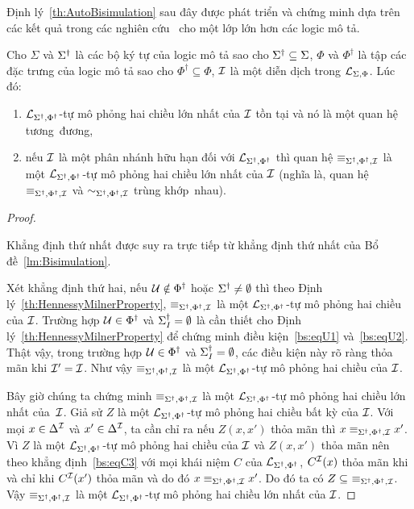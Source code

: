 Định lý~\ref{th:AutoBisimulation} sau đây được phát triển và chứng minh dựa trên các kết quả trong các nghiên cứu~\cite{Divroodi2011B,Nguyen2013} cho một lớp lớn hơn các logic mô tả.

\begin{Theorem} 
\label{th:AutoBisimulation}
	Cho $\Sigma$ và $\Sigma^\dag$ là các bộ ký tự của logic mô tả sao cho $\Sigma^\dag \subseteq \Sigma$, $\Phi$ và $\Phi^\dag$ là tập các đặc trưng của logic mô tả sao cho $\Phi^\dag \subseteq \Phi$, $\mathcal{I}$ là một diễn dịch trong $\mathcal{L}_{\Sigma,\Phi}$. Lúc đó:
	\begin{enumerate}
		\item $\mathcal{L}_{\Sigma^\dag,\Phi^\dag}$-tự mô phỏng hai chiều lớn nhất của $\mathcal{I}$ tồn tại và nó là một quan hệ tương~đương,\label{th:AutoBisimulation-item1}  
		\item nếu $\mathcal{I}$ là một phân nhánh hữu hạn đối với $\mathcal{L}_{\Sigma^\dag,\Phi^\dag}$ thì quan hệ $\equiv_{\Sigma^\dag,\Phi^\dag,\mathcal{I}}$ là một $\mathcal{L}_{\Sigma^\dag,\Phi^\dag}$-tự mô phỏng hai chiều lớn nhất của $\mathcal{I}$ (nghĩa là, quan hệ $\equiv_{\Sigma^\dag,\Phi^\dag,\mathcal{I}}$ và $\sim_{\Sigma^\dag,\Phi^\dag,\mathcal{I}}$ trùng khớp~nhau).\label{th:AutoBisimulation-item2}\myend
	\end{enumerate}
\end{Theorem}

\begin{proof}~

\semiItem Khẳng định thứ nhất được suy ra trực tiếp từ khẳng định thứ nhất của Bổ đề~\ref{lm:Bisimulation}.

\semiItem Xét khẳng định thứ hai, nếu $\mathcal{U} \notin \Phi^\dag$ hoặc $\Sigma^\dag \not= \emptyset$ thì theo Định lý~\ref{th:HennessyMilnerProperty}, $\equiv_{\Sigma^\dag,\Phi^\dag,\mathcal{I}}$ là một $\mathcal{L}_{\Sigma^\dag,\Phi^\dag}$-tự mô phỏng hai chiều của $\mathcal{I}$.
Trường hợp $\mathcal{U} \in \Phi^\dag$ và $\Sigma^\dag_I = \emptyset$
là cần thiết cho Định lý~\ref{th:HennessyMilnerProperty} để chứng minh điều kiện~\eqref{bs:eqU1} và~\eqref{bs:eqU2}. Thật vậy, trong trường hợp $\mathcal{U} \in \Phi^\dag$ và $\Sigma^\dag_I = \emptyset$, các điều kiện này rõ ràng thỏa mãn khi $\mathcal{I}' = \mathcal{I}$. Như vậy $\equiv_{\Sigma^\dag,\Phi^\dag,\mathcal{I}}$ là một $\mathcal{L}_{\Sigma^\dag,\Phi^\dag}$-tự mô phỏng hai chiều của $\mathcal{I}$.

Bây giờ chúng ta chứng minh $\equiv_{\Sigma^\dag,\Phi^\dag,\mathcal{I}}$ là một $\mathcal{L}_{\Sigma^\dag,\Phi^\dag}$-tự mô phỏng hai chiều lớn nhất của~$\mathcal{I}$. Giả sử $Z$ là một $\mathcal{L}_{\Sigma^\dag,\Phi^\dag}$-tự mô phỏng hai chiều bất kỳ của $\mathcal{I}$. Với mọi $x \in \Delta^{\mathcal{I}}$ và $x' \in \Delta^{\mathcal{I}}$, ta cần chỉ ra nếu $Z(x,x')$ thỏa mãn thì $x \equiv_{\Sigma^\dag,\Phi^\dag,\mathcal{I}} x'$. Vì $Z$ là một $\mathcal{L}_{\Sigma^\dag,\Phi^\dag}$-tự mô phỏng hai chiều của $\mathcal{I}$ và $Z(x,x')$ thỏa mãn nên theo khẳng định~\eqref{bs:eqC3} với mọi khái niệm $C$ của $\mathcal{L}_{\Sigma^\dag,\Phi^\dag}$, $C^{\mathcal{I}}(x)$ thỏa mãn khi và chỉ khi $C^{\mathcal{I}}(x')$ thỏa mãn và do đó $x \equiv_{\Sigma^\dag,\Phi^\dag,\mathcal{I}} x'$. Do đó ta có $Z \subseteq\ \equiv_{\Sigma^\dag,\Phi^\dag,\mathcal{I}}$. Vậy $\equiv_{\Sigma^\dag,\Phi^\dag,\mathcal{I}}$ là một $\mathcal{L}_{\Sigma^\dag,\Phi^\dag}$-tự mô phỏng hai chiều lớn nhất của $\mathcal{I}$.
\end{proof}


